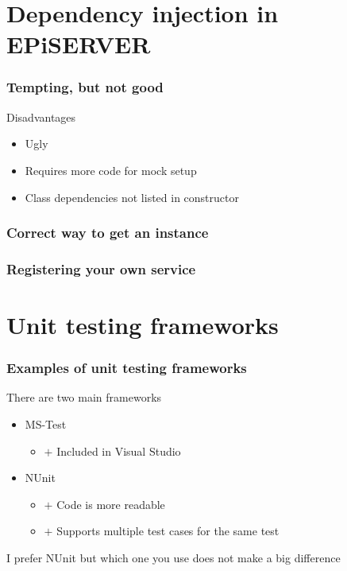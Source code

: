 \documentclass{beamer}
\begin{document}
	\section{Dependency injection in EPiSERVER}
		\begin{frame}
			\frametitle{Tempting, but not good}
			 \pause
			\begin{exampleblock}{Disadvantages} \pause
				\begin{itemize}
					\item Ugly \pause
					\item Requires more code for mock setup \pause
					\item Class dependencies not listed in constructor
				\end{itemize}
			\end{exampleblock}
		\end{frame}
		\begin{frame}
			\frametitle{Correct way to get an instance}
			
		\end{frame}
		\begin{frame}
			\frametitle{Registering your own service}
			
		\end{frame}

	\section{Unit testing frameworks}
	\begin{frame}
			\frametitle{Examples of unit testing frameworks} \pause
			\begin{exampleblock}{There are two main frameworks} \pause
			\begin{itemize}
				\item MS-Test \pause
				\begin{itemize}
					\item $+$ Included in Visual Studio \pause
				\end{itemize}
				\item NUnit \pause
				\begin{itemize}
					\item $+$ Code is more readable \pause
					\item $+$ Supports multiple test cases for the same test \pause
				\end{itemize}
			\end{itemize}
			\end{exampleblock}

			\begin{exampleblock}{I prefer NUnit but which one you use does not make a big difference}
			\end{exampleblock}
		\end{frame}
\end{document}
